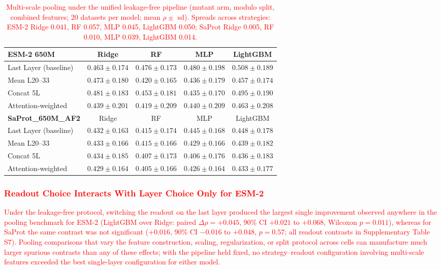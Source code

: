 \documentclass[numbered,webpdf,modern,large]{oup-authoring-template}
\newcommand{\rev}[1]{\textcolor{red}{#1}}
\begin{document}
\begin{table}[ht]
\centering
\caption{\rev{Multi-scale pooling under the unified leakage-free pipeline (mutant
arm, modulo split, combined features; 20 datasets per model; mean $\rho \pm$ sd).
Spreads across strategies: ESM-2 Ridge 0.041, RF 0.057, MLP 0.045, LightGBM 0.050;
SaProt Ridge 0.005, RF 0.010, MLP 0.039, LightGBM 0.014.}}
\label{tab:pooling}
\begin{tabular}{lcccc}
\toprule
\textbf{ESM-2 650M} & Ridge & RF & MLP & LightGBM \\
\midrule
Last Layer (baseline) & $0.463 \pm 0.174$ & $0.476 \pm 0.173$ & $0.480 \pm 0.198$ & $\mathbf{0.508} \pm 0.189$ \\
Mean L20--33          & $0.473 \pm 0.180$ & $0.420 \pm 0.165$ & $0.436 \pm 0.179$ & $0.457 \pm 0.174$ \\
Concat 5L             & $0.481 \pm 0.183$ & $0.453 \pm 0.181$ & $0.435 \pm 0.170$ & $0.495 \pm 0.190$ \\
Attention-weighted    & $0.439 \pm 0.201$ & $0.419 \pm 0.209$ & $0.440 \pm 0.209$ & $0.463 \pm 0.208$ \\
\midrule
\textbf{SaProt\_650M\_AF2} & Ridge & RF & MLP & LightGBM \\
\midrule
Last Layer (baseline) & $0.432 \pm 0.163$ & $0.415 \pm 0.174$ & $0.445 \pm 0.168$ & $\mathbf{0.448} \pm 0.178$ \\
Mean L20--33          & $0.433 \pm 0.166$ & $0.415 \pm 0.166$ & $0.429 \pm 0.166$ & $0.439 \pm 0.182$ \\
Concat 5L             & $0.434 \pm 0.185$ & $0.407 \pm 0.173$ & $0.406 \pm 0.176$ & $0.436 \pm 0.183$ \\
Attention-weighted    & $0.429 \pm 0.164$ & $0.405 \pm 0.166$ & $0.426 \pm 0.164$ & $0.433 \pm 0.177$ \\
\bottomrule
\end{tabular}
\end{table}

\subsubsection{\rev{Readout Choice Interacts With Layer Choice Only for ESM-2}}

\rev{Under the leakage-free protocol, switching the readout on the last layer
produced the largest single improvement observed anywhere in the pooling
benchmark for ESM-2 (LightGBM over Ridge: paired $\Delta\rho = +0.045$,
90\% CI $+0.021$ to $+0.068$, Wilcoxon $p = 0.011$), whereas for SaProt the
same contrast was not significant ($+0.016$, 90\% CI $-0.016$ to $+0.048$,
$p = 0.57$; all readout contrasts in Supplementary Table S7). Pooling
comparisons that vary the feature construction,
scaling, regularization, or split protocol across cells can manufacture much
larger spurious contrasts than any of these effects; with the pipeline held
fixed, no strategy--readout configuration involving multi-scale features
exceeded the best single-layer configuration for either model.}
\end{document}
